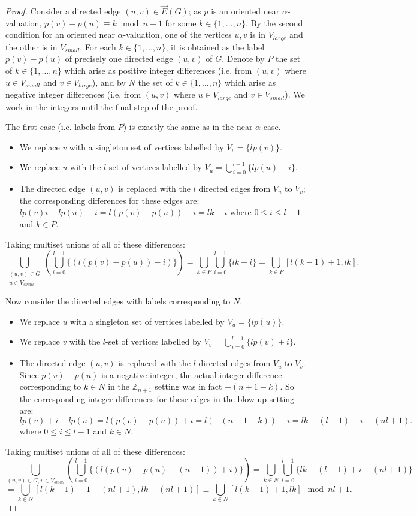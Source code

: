 \documentclass[10pt,a4paper]{amsart}
\begin{document}
\begin{proof}

Consider a directed edge $(u,v) \in \overrightarrow{E}(G)$; as $p$ is an oriented near $\alpha$-valuation, 
$p(v)-p(u) \equiv k \mod n+1$
for some $k\in \{1,\ldots,n\}$.  By the second condition for an oriented near $\alpha$-valuation, one of the vertices $u,v$ is in $V_{large}$ and the other is in $V_{small}$. For each $k \in \{1,\ldots,n\}$, it is obtained as the label $p(v)-p(u)$ of precisely one directed edge $(u,v)$ of $G$.  Denote by $P$ the set of $k\in \{1,\ldots,n\}$ which arise as positive integer differences (i.e. from $(u,v)$ where $u \in V_{small}$ and $v \in V_{large}$), and by $N$ the set of $k \in \{1,\ldots,n\}$ which arise as negative integer differences (i.e. from $(u,v)$ where $u \in V_{large}$ and $v \in V_{small}$).  We work in the integers until the final step of the proof.

The first case (i.e. labels from $P$) is exactly the same as in the near $\alpha$ case. 
\begin{itemize}
\item We replace $v$ with a singleton set of vertices labelled by $V_v=\{lp(v)\}$.
\item We replace $u$ with the $l$-set of vertices labelled by $V_u = \bigcup_{i=0}^{l-1}\{lp(u)+i\}$.
\item The directed edge $(u,v)$ is replaced with the $l$ directed edges from $V_u$ to $V_v$; the corresponding differences for these edges are:
$lp(v)i-lp(u)-i =  l(p(v)-p(u))-i = lk-i$
where $0 \leq i \leq l-1$ and $k \in P$. 
\end{itemize}

Taking multiset unions of all of these differences:
\[
\bigcup_{\substack{(u,v) \in G \\ u \in V_{small}}} \left( \bigcup_{i=0}^{l-1} \{ (l(p(v)-p(u))-i) \} \right)
= \bigcup_{k\in P} \bigcup_{i=0}^{l-1} \{ lk-i \} = \bigcup_{k \in P}[l(k-1)+1,lk]. 
\]

Now consider the directed edges with labels corresponding to $N$. 
\begin{itemize}
\item We replace $u$ with a singleton set of vertices labelled by $V_u=\{lp(u)\}$.
\item We replace $v$ with the $l$-set of vertices labelled by $V_v = \bigcup_{i=0}^{l-1}\{lp(v)+i\}$.
\item  The directed edge $(u,v)$ is replaced with the $l$ directed edges from $V_u$ to $V_v$.  Since $p(v)-p(u)$ is a negative integer, the actual integer difference corresponding to $k \in N$ in the $\mathbb{Z}_{n+1}$ setting was in fact $-(n+1-k)$.  So the corresponding integer differences for these edges in the blow-up setting are:
\[lp(v)+i-lp(u)=l(p(v)-p(u))+i = l(-(n+1-k))+i=lk-(l-1)+i-(nl+1).\]
where $0 \leq i \leq l-1$ and $k \in N$.  
\end{itemize}
Taking multiset unions of all of these differences:
\[
\bigcup_{(u,v) \in G, v \in V_{small}} \left( \bigcup_{i=0}^{l-1} \{ (l(p(v)-p(u)-(n-1))+i) \} \right)
= \bigcup_{k\in N} \bigcup_{i=0}^{l-1} \{ lk-(l-1)+i-(nl+1) \}\]
\[= \bigcup_{k \in N}[l(k-1)+1-(nl+1),lk-(nl+1)] \equiv \bigcup_{k \in N}[l(k-1)+1,lk]\mod nl+1. \]


\end{proof}
\end{document}
